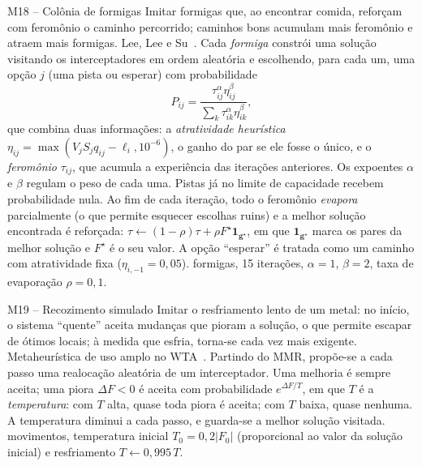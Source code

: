\begin{metodo}{M18 -- Colônia de formigas}
\ideia Imitar formigas que, ao encontrar comida, reforçam com feromônio o caminho percorrido; caminhos bons acumulam mais
feromônio e atraem mais formigas.
\orig Lee, Lee e Su~\cite{lee2002aco}.
\func Cada \emph{formiga} constrói uma solução visitando os interceptadores em ordem aleatória e escolhendo, para cada um,
uma opção $j$ (uma pista ou esperar) com probabilidade
\begin{equation}
  P_{ij}=\frac{\tau_{ij}^{\alpha}\eta_{ij}^{\beta}}{\sum_{k}\tau_{ik}^{\alpha}\eta_{ik}^{\beta}},
\end{equation}
que combina duas informações: a \emph{atratividade heurística} $\eta_{ij}=\max(V_jS_jq_{ij}-\ell_i,10^{-6})$, o ganho do
par se ele fosse o único, e o \emph{feromônio} $\tau_{ij}$, que acumula a experiência das iterações anteriores. Os
expoentes $\alpha$ e $\beta$ regulam o peso de cada uma. Pistas já no limite de capacidade recebem probabilidade nula. Ao
fim de cada iteração, todo o feromônio \emph{evapora} parcialmente (o que permite esquecer escolhas ruins) e a melhor
solução encontrada é reforçada: $\tau\leftarrow(1-\rho)\tau+\rho F^\star\mathbf{1}_{\bm{g}^\star}$, em que
$\mathbf{1}_{\bm{g}^\star}$ marca os pares da melhor solução e $F^\star$ é o seu valor.
\adap A opção ``esperar'' é tratada como um caminho com atratividade fixa ($\eta_{i,-1}=0{,}05$).
 formigas, 15 iterações, $\alpha=1$, $\beta=2$, taxa de evaporação $\rho=0{,}1$.
\end{metodo}

\begin{metodo}{M19 -- Recozimento simulado}
\ideia Imitar o resfriamento lento de um metal: no início, o sistema ``quente'' aceita mudanças que pioram a solução, o que
permite escapar de ótimos locais; à medida que esfria, torna-se cada vez mais exigente.
\orig Metaheurística de uso amplo no WTA~\cite{kline2019}.
\func Partindo do MMR, propõe-se a cada passo uma realocação aleatória de um interceptador. Uma melhoria é sempre aceita;
uma piora $\Delta F<0$ é aceita com probabilidade $e^{\Delta F/T}$, em que $T$ é a \emph{temperatura}: com $T$ alta, quase
toda piora é aceita; com $T$ baixa, quase nenhuma. A temperatura diminui a cada passo, e guarda-se a melhor solução
visitada.
 movimentos, temperatura inicial $T_0=0{,}2|F_0|$ (proporcional ao valor da solução inicial) e resfriamento
$T\leftarrow0{,}995\,T$.
\end{metodo}

